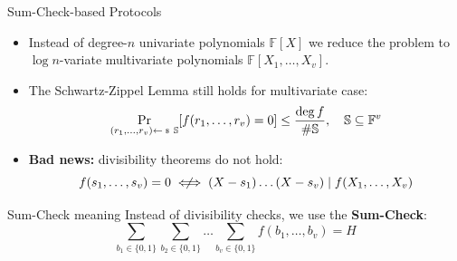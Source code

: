\documentclass{zkdl-presentation-template}
\begin{document}
    \begin{frame}{Sum-Check-based Protocols}
        \begin{itemize}
            \item Instead of degree-$n$ univariate polynomials $\mathbb{F}[X]$
            we reduce the problem to $\log n$-variate multivariate polynomials
            $\mathbb{F}[X_1,\dots,X_v]$.
            \item \pause The Schwartz-Zippel Lemma still holds for multivariate case:
            \begin{equation*}
                \Pr_{(r_1,\dots,r_v) \leftarrowS \mathbb{S}}[f(r_1,\dots,r_v) = 0] \leq \frac{\deg f}{\#\mathbb{S}}, \quad \mathbb{S} \subseteq \mathbb{F}^v
            \end{equation*}
            \item \pause \textcolor{oc-red-8}{\textbf{Bad news:}} divisibility theorems do not hold:
            \begin{equation*}
                f(s_1,\dots,s_v) = 0 \centernot\iff (X-s_1)\dots (X-s_v) \mid f(X_1,\dots,X_v)
            \end{equation*}
        \end{itemize}

        \pause\begin{block}{Sum-Check meaning}
            Instead of divisibility checks, we use the \textbf{Sum-Check}:
            \begin{equation*}
                \sum_{b_1 \in \{0,1\}}\sum_{b_2 \in \{0,1\}}\dots \sum_{b_v \in \{0,1\}} f(b_1,\dots,b_v) = H
            \end{equation*}
        \end{block}
    \end{frame}
\end{document}
